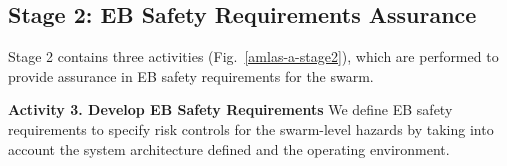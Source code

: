 \documentclass[runningheads]{llncs}
\begin{document}
\subsection{Stage 2: EB Safety Requirements Assurance} \label{framework-stage2}
Stage 2 contains three activities (Fig.~\ref{amlas-a-stage2}), which are performed to provide assurance in EB safety requirements for the swarm. 

\noindent\textbf{Activity 3. Develop EB Safety Requirements} %
We define EB safety requirements to specify risk controls for the swarm-level hazards by taking into account the system architecture defined and the operating environment. 
\end{document}
